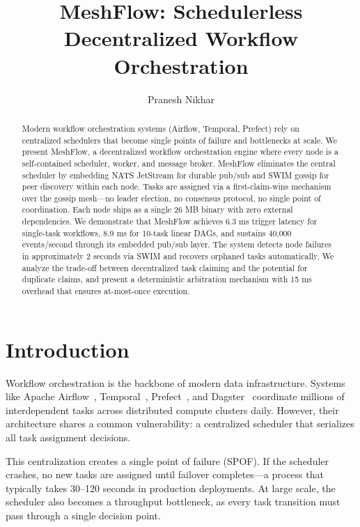 \documentclass[sigconf]{acmart}
\begin{document}
\title{MeshFlow: Schedulerless Decentralized Workflow Orchestration}

\author{Pranesh Nikhar}

\begin{abstract}
Modern workflow orchestration systems (Airflow, Temporal, Prefect) rely on centralized schedulers that become single points of failure and bottlenecks at scale. We present MeshFlow, a decentralized workflow orchestration engine where every node is a self-contained scheduler, worker, and message broker. MeshFlow eliminates the central scheduler by embedding NATS JetStream for durable pub/sub and SWIM gossip for peer discovery within each node. Tasks are assigned via a first-claim-wins mechanism over the gossip mesh---no leader election, no consensus protocol, no single point of coordination. Each node ships as a single 26 MB binary with zero external dependencies. We demonstrate that MeshFlow achieves 6.3 ms trigger latency for single-task workflows, 8.9 ms for 10-task linear DAGs, and sustains 40,000 events/second through its embedded pub/sub layer. The system detects node failures in approximately 2 seconds via SWIM and recovers orphaned tasks automatically. We analyze the trade-off between decentralized task claiming and the potential for duplicate claims, and present a deterministic arbitration mechanism with 15 ms overhead that ensures at-most-once execution.
\end{abstract}

\maketitle

\section{Introduction}

Workflow orchestration is the backbone of modern data infrastructure. Systems like Apache Airflow~\cite{airflow}, Temporal~\cite{temporal}, Prefect~\cite{prefect}, and Dagster~\cite{dagster} coordinate millions of interdependent tasks across distributed compute clusters daily. However, their architecture shares a common vulnerability: a centralized scheduler that serializes all task assignment decisions.

This centralization creates a single point of failure (SPOF). If the scheduler crashes, no new tasks are assigned until failover completes---a process that typically takes 30--120 seconds in production deployments. At large scale, the scheduler also becomes a throughput bottleneck, as every task transition must pass through a single decision point.
\end{document}
